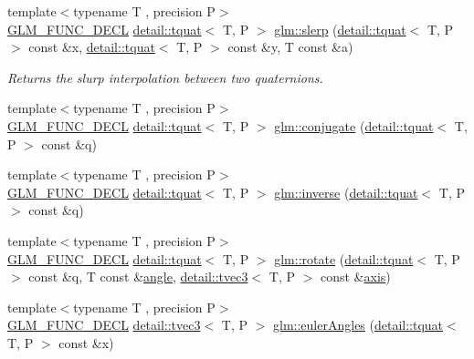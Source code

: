 \begin{DoxyCompactItemize}
\item 
{\footnotesize template$<$typename T , precision P$>$ }\\\hyperlink{setup_8hpp_ab2d052de21a70539923e9bcbf6e83a51}{G\+L\+M\+\_\+\+F\+U\+N\+C\+\_\+\+D\+E\+CL} \hyperlink{structglm_1_1detail_1_1tquat}{detail\+::tquat}$<$ T, P $>$ \hyperlink{group__gtc__quaternion_ga7468a211a20ea56ea5cfb0625226868a}{glm\+::slerp} (\hyperlink{structglm_1_1detail_1_1tquat}{detail\+::tquat}$<$ T, P $>$ const \&x, \hyperlink{structglm_1_1detail_1_1tquat}{detail\+::tquat}$<$ T, P $>$ const \&y, T const \&a)
\begin{DoxyCompactList}\small\item\em Returns the slurp interpolation between two quaternions. \end{DoxyCompactList}\item 
{\footnotesize template$<$typename T , precision P$>$ }\\\hyperlink{setup_8hpp_ab2d052de21a70539923e9bcbf6e83a51}{G\+L\+M\+\_\+\+F\+U\+N\+C\+\_\+\+D\+E\+CL} \hyperlink{structglm_1_1detail_1_1tquat}{detail\+::tquat}$<$ T, P $>$ \hyperlink{group__gtc__quaternion_gaf78006c47276b151777fc194cf11a688}{glm\+::conjugate} (\hyperlink{structglm_1_1detail_1_1tquat}{detail\+::tquat}$<$ T, P $>$ const \&q)
\item 
{\footnotesize template$<$typename T , precision P$>$ }\\\hyperlink{setup_8hpp_ab2d052de21a70539923e9bcbf6e83a51}{G\+L\+M\+\_\+\+F\+U\+N\+C\+\_\+\+D\+E\+CL} \hyperlink{structglm_1_1detail_1_1tquat}{detail\+::tquat}$<$ T, P $>$ \hyperlink{group__gtc__quaternion_ga6613ef61cb980a18f19ece5f421564da}{glm\+::inverse} (\hyperlink{structglm_1_1detail_1_1tquat}{detail\+::tquat}$<$ T, P $>$ const \&q)
\item 
{\footnotesize template$<$typename T , precision P$>$ }\\\hyperlink{setup_8hpp_ab2d052de21a70539923e9bcbf6e83a51}{G\+L\+M\+\_\+\+F\+U\+N\+C\+\_\+\+D\+E\+CL} \hyperlink{structglm_1_1detail_1_1tquat}{detail\+::tquat}$<$ T, P $>$ \hyperlink{group__gtc__quaternion_gaa9a8891f03d8f5373525c4b3159c1c73}{glm\+::rotate} (\hyperlink{structglm_1_1detail_1_1tquat}{detail\+::tquat}$<$ T, P $>$ const \&q, T const \&\hyperlink{group__gtc__quaternion_ga23a3fc7ada5bbb665ff84c92c6e0542c}{angle}, \hyperlink{structglm_1_1detail_1_1tvec3}{detail\+::tvec3}$<$ T, P $>$ const \&\hyperlink{group__gtc__quaternion_ga8eef9f8c3f2e4836dccf09df975b20fb}{axis})
\item 
{\footnotesize template$<$typename T , precision P$>$ }\\\hyperlink{setup_8hpp_ab2d052de21a70539923e9bcbf6e83a51}{G\+L\+M\+\_\+\+F\+U\+N\+C\+\_\+\+D\+E\+CL} \hyperlink{structglm_1_1detail_1_1tvec3}{detail\+::tvec3}$<$ T, P $>$ \hyperlink{group__gtc__quaternion_gade4034f49ccadf63cb31a7fb5fa3c8aa}{glm\+::euler\+Angles} (\hyperlink{structglm_1_1detail_1_1tquat}{detail\+::tquat}$<$ T, P $>$ const \&x)

\end{DoxyCompactItemize}

